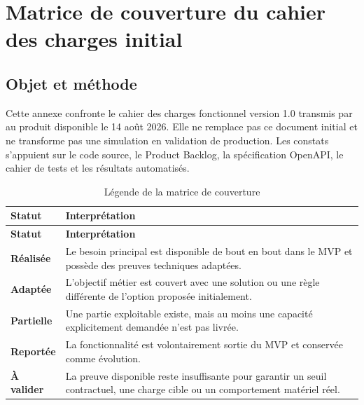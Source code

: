 \chapter{Matrice de couverture du cahier des charges initial}
\label{app:specification-coverage}

\newcommand{\covreal}{\textbf{\textcolor{ctgreen}{Réalisée}}}
\newcommand{\covadapt}{\textbf{\textcolor{ctblue}{Adaptée}}}
\newcommand{\covpartial}{\textbf{\textcolor{ctamber}{Partielle}}}
\newcommand{\covdeferred}{\textbf{\textcolor{ctgray}{Reportée}}}
\newcommand{\covvalidate}{\textbf{\textcolor{ctamber}{À valider}}}

\section{Objet et méthode}

Cette annexe confronte le cahier des charges fonctionnel version 1.0 transmis par
\CompanyName{} au produit disponible le 14 août 2026. Elle ne remplace pas ce
document initial et ne transforme pas une simulation en validation de
production. Les constats s'appuient sur le code source, le Product Backlog, la
spécification OpenAPI, le cahier de tests et les résultats automatisés.

\begin{longtable}{|C{2.4cm}|p{11.7cm}|}
  \caption{Légende de la matrice de couverture}
  \label{tab:coverage-legend}\\
  \hline
  \textbf{Statut} & \textbf{Interprétation}\\
  \hline
  \endfirsthead
  \hline
  \textbf{Statut} & \textbf{Interprétation}\\
  \hline
  \endhead
  \covreal & Le besoin principal est disponible de bout en bout dans le MVP et
  possède des preuves techniques adaptées.\\\hline
  \covadapt & L'objectif métier est couvert avec une solution ou une règle
  différente de l'option proposée initialement.\\\hline
  \covpartial & Une partie exploitable existe, mais au moins une capacité
  explicitement demandée n'est pas livrée.\\\hline
  \covdeferred & La fonctionnalité est volontairement sortie du MVP et conservée
  comme évolution.\\\hline
  \covvalidate & La preuve disponible reste insuffisante pour garantir un seuil
  contractuel, une charge cible ou un comportement matériel réel.\\
  \hline
\end{longtable}

